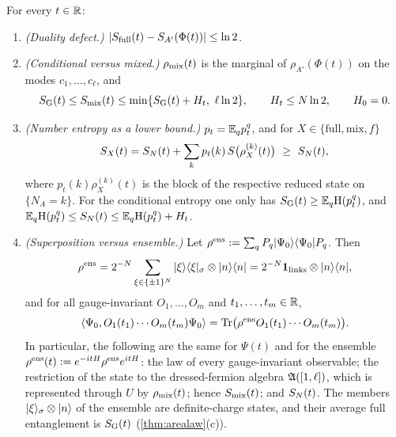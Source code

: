 \begin{proposition}\label{prop:entropies}
For every $t\in\mathbb{R}$:
\begin{enumerate}[label=(\alph*)]
\item \emph{(Duality defect.)}  $|S_{\mathrm{full}}(t)-S_{A'}(\Phi(t))|\le\ln2$.
\item \emph{(Conditional versus mixed.)}  $\rho_{\rm mix}(t)$ is the marginal of $\rho_{A'}(\Phi(t))$ on the modes
$c_1,\dots,c_\ell$, and
\[
  \SG(t)\le\Smix(t)\le\min\{\SG(t)+H_t,\ \ell\ln2\},\qquad H_t\le N\ln2,\qquad H_0=0 .
\]
\item \emph{(Number entropy as a lower bound.)}  $p_t=\mathbb{E}_qp^q_t$, and for $X\in\{\mathrm{full},\mathrm{mix},f\}$
\[
  S_X(t)=\SN(t)+\sum_kp_t(k)\,S\bigl(\rho_X^{(k)}(t)\bigr)\ \ge\ \SN(t),
\]
where $p_t(k)\rho^{(k)}_X(t)$ is the block of the respective reduced state on $\{N_A=k\}$.  For the conditional
entropy one only has $S_{\mathrm{G}}(t)\ge\mathbb{E}_q\mathrm{H}(p^q_t)$, and $\mathbb{E}_q\mathrm{H}(p^q_t)\le S_{N}(t)\le\mathbb{E}_q\mathrm{H}(p^q_t)+H_t$.
\item \emph{(Superposition versus ensemble.)}  Let $\rho^{\rm ens}:=\sum_qP_q|\Psi_0\rangle\langle \Psi_0|P_q$.  Then
\[
  \rho^{\rm ens}=2^{-N}\sum_{\xi\in\{\pm1\}^N}|\xi\rangle\langle \xi|_\sigma\otimes|n\rangle\langle n|=2^{-N}\mathbf{1}_{\rm links}\otimes|n\rangle\langle n|,
\]
and for all gauge-invariant $O_1,\dots,O_m$ and $t_1,\dots,t_m\in\mathbb{R}$,
\begin{equation}\label{eq:main-ens}
  \langle\Psi_0,O_1(t_1)\cdots O_m(t_m)\Psi_0\rangle=\operatorname{Tr}\bigl(\rho^{\rm ens}O_1(t_1)\cdots O_m(t_m)\bigr).
\end{equation}
In particular, the following are the same for $\Psi(t)$ and for the ensemble
$\rho^{\rm ens}(t):=e^{-itH}\rho^{\rm ens}e^{itH}$: the law of every gauge-invariant observable; the restriction of
the state to the dressed-fermion algebra $\mathfrak{A}([1,\ell])$, which is represented through $U$ by $\rho_{\rm mix}(t)$;
hence $S_{\mathrm{mix}}(t)$; and $S_{N}(t)$.  The members $|\xi\rangle_\sigma\otimes|n\rangle$ of the
ensemble are definite-charge states, and their average full entanglement is $S_{\mathrm{G}}(t)$
(\cref{thm:arealaw}(c)).
\end{enumerate}
\end{proposition}

